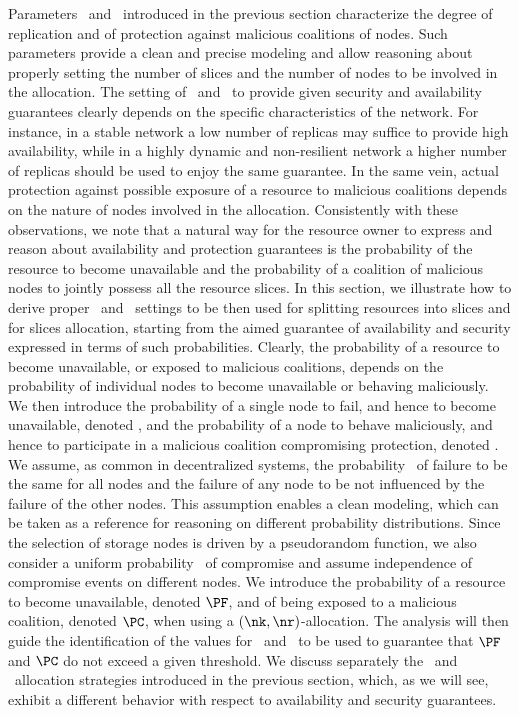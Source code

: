 Parameters \nr\ and \nk\ introduced in the previous section
characterize the degree of replication and of protection against
malicious coalitions of nodes.  Such parameters provide a clean and
precise modeling and allow reasoning about properly setting the number
of slices and the number of nodes to be involved in the allocation.
The setting of \nk\ and \nr\ to provide given security and
availability guarantees clearly depends on the specific
characteristics of the network.  For instance, in a stable network a
low number of replicas may suffice to provide high availability, while
in a highly dynamic and non-resilient network a higher number of
replicas should be used to enjoy the same guarantee. In the same vein,
actual protection against possible exposure of a resource to malicious
coalitions depends on the nature of nodes involved in the allocation.
Consistently with these observations, we note that a natural way for
the resource owner to express and reason about availability and
protection guarantees is the probability of the resource to become
unavailable and the probability of a coalition of malicious nodes to
jointly possess all the resource slices.  In this section, we
illustrate how to derive proper \nr\ and \nk\ settings to be then used
for splitting resources into slices and for slices allocation,
starting from the aimed guarantee of availability and security
expressed in terms of such probabilities.  Clearly, the probability of
a resource to become unavailable, or exposed to malicious coalitions,
depends on the probability of individual nodes to become unavailable
or behaving maliciously.  We then introduce the probability of a
single node to fail, and hence to become unavailable, denoted \pf, and
the probability of a node to behave maliciously, and hence to
participate in a malicious coalition compromising protection, denoted
\pc.  We assume, as common in decentralized systems, the probability
\pf\ of failure to be the same for all nodes and the failure of any
node to be not influenced by the failure of the other nodes. This
assumption enables a clean modeling, which can be taken as a reference
for reasoning on different probability distributions. Since the
selection of storage nodes is driven by a pseudorandom function, we
also consider a uniform probability \pc\ of compromise and assume
independence of compromise events on different nodes.  We introduce
the probability of a resource to become unavailable, denoted $\PF$,
and of being exposed to a malicious coalition, denoted $\PC$, when
using a $(\nk,\nr)$-allocation.  The analysis will then guide the
identification of the values for \nk\ and \nr\ to be used to guarantee
that $\PF$ and $\PC$ do not exceed a given threshold.  We discuss
separately the \diagonal\ and \compact\ allocation strategies
introduced in the previous section, which, as we will see, exhibit a
different behavior with respect to availability and security
guarantees.

